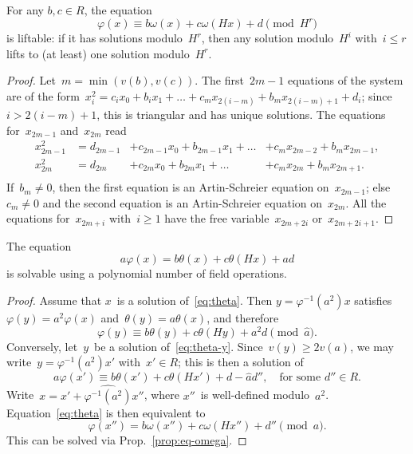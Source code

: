 \documentclass{llncs}
\begin{document}
\begin{proposition}\label{prop:eq-omega}
For any $b, c ∈ R$, the equation
\begin{equation}\label{eq:eq-omega}
φ(x) ≡ b ω(x) + c ω(Hx) + d \pmod{H^r}
\end{equation}
is liftable: if it has solutions modulo~$H^r$, then any solution
modulo~$H^i$ with~$i ≤ r$ lifts to (at least) one solution
modulo~$H^r$.
\end{proposition}


\begin{proof}
Let~$m = \min (v(b), v(c))$. The first~$2m-1$ equations of the system are
of the form~$x_i^2 = c_i x_0 + b_i x_1 + \dots + c_{m} x_{2(i-m)} +
b_m x_{2(i-m)+1} + d_i$; since~$i > 2(i-m)+1$, this is triangular and has
unique solutions. The equations for~$x_{2m-1}$ and~$x_{2m}$ read
\begin{equation}\label{eq:x2m}\begin{array}{llll}
x_{2m-1}^2 &= d_{2m-1} &+ c_{2m-1} x_0 + b_{2m-1} x_1 + \dots
  &+ c_{m} x_{2m-2} + b_{m} x_{2m-1},\\
x_{2m}^2 &= d_{2m} &+ c_{2m} x_0 + b_{2m} x_1 + \dots
  &+ c_{m} x_{2m} + b_{m} x_{2m+1}.\\
\end{array}\end{equation}
If~$b_m ≠ 0$, then the first equation is an Artin-Schreier equation
on~$x_{2m-1}$; else~$c_m ≠ 0$ and the second equation is an
Artin-Schreier equation on~$x_{2m}$. All the equations for~$x_{2m+i}$
with~$i ≥ 1$ have the free variable~$x_{2m+2i}$ or~$x_{2m+2i+1}$.
\end{proof}


\begin{proposition}\label{prop:eq}
The equation
\begin{equation}\label{eq:theta}
a φ(x) = b θ(x) + c θ(Hx) + ad
\end{equation}
is solvable using a polynomial number of field operations.
\end{proposition}

\begin{proof}
Assume that $x$~is a solution of~\eqref{eq:theta}. Then $y = φ^{-1}(a^2)
x$ satisfies~$φ(y) = a^2 φ(x)$ and~$θ(y) = a θ(x)$, and therefore
\begin{equation}\label{eq:theta-y}
φ(y) ≡ b θ(y) + c θ(Hy) + a^2d \pmod{\widehat{a}}.
\end{equation}
Conversely, let~$y$~be a solution of~\eqref{eq:theta-y}. Since~$v(y) ≥
2 v(a)$, we may write~$y = φ^{-1}(a^2) x'$ with~$x' ∈ R$; this is
then a solution of
\begin{equation}\label{eq:theta-x0}
a φ(x') ≡ b θ(x') + c θ(H x') + d - \widehat{a} d'',\quad
\text{for some~$d'' ∈ R$.}
\end{equation}
Write~$x = x' + \widehat{φ^{-1}(a^2)} x''$, where $x''$~is well-defined
modulo~$a^2$. Equation~\eqref{eq:theta} is then equivalent to
\begin{equation}\label{eq:omega-x1}
φ(x'') = b ω(x'') + c ω(H x'') + d'' \pmod{a}.
\end{equation}
This can be solved via Prop.~\ref{prop:eq-omega}.
\end{proof}
\end{document}
